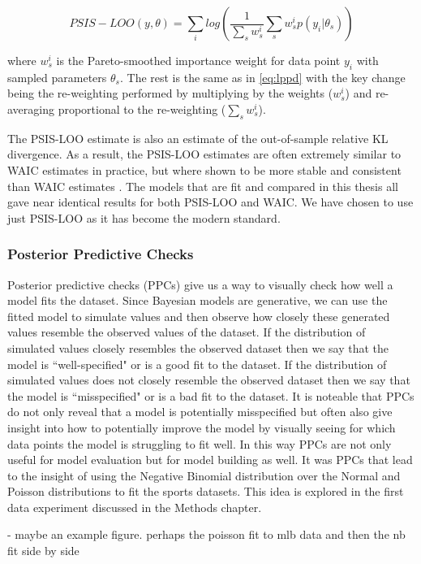 \begin{equation} \label{eq:psis-loo}
PSIS-LOO(y, \theta) = \sum_i log \left( \frac{1}{\sum_s w_s^i} \sum_s w_s^i p(y_i | \theta_s) \right)
\end{equation}

where $w_s^i$ is the Pareto-smoothed importance weight for data point $y_i$ with sampled parameters $\theta_s$. The rest is the same as in \ref{eq:lppd} with the key change being the re-weighting performed by multiplying by the weights ($w_s^i$) and re-averaging proportional to the re-weighting ($\sum_s w_s^i$).

The PSIS-LOO estimate is also an estimate of the out-of-sample relative KL divergence. As a result, the PSIS-LOO estimates are often extremely similar to WAIC estimates in practice, but where shown to be more stable and consistent than WAIC estimates \cite{Vehtari2016}. The models that are fit and compared in this thesis all gave near identical results for both PSIS-LOO and WAIC. We have chosen to use just PSIS-LOO as it has become the modern standard.

\subsubsection{Posterior Predictive Checks} \label{ppc}

Posterior predictive checks (PPCs) give us a way to visually check how well a model fits the dataset. Since Bayesian models are generative, we can use the fitted model to simulate values and then observe how closely these generated values resemble the observed values of the dataset. If the distribution of simulated values closely resembles the observed dataset then we say that the model is ``well-specified" or is a good fit to the dataset. If the distribution of simulated values does not closely resemble the observed dataset then we say that the model is ``misspecified" or is a bad fit to the dataset. It is noteable that PPCs do not only reveal that a model is potentially misspecified but often also give insight into how to potentially improve the model by visually seeing for which data points the model is struggling to fit well. In this way PPCs are not only useful for model evaluation but for model building as well. It was PPCs that lead to the insight of using the Negative Binomial distribution over the Normal and Poisson distributions to fit the sports datasets. This idea is explored in the first data experiment discussed in the Methods chapter.

- maybe an example figure. perhaps the poisson fit to mlb data and then the nb fit side by side
